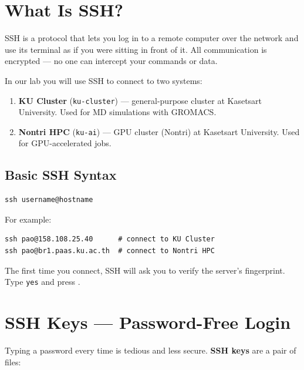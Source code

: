 \documentclass[12pt,a4paper]{article}
\newcommand{\defbox}[2]{%
  \begin{tcolorbox}[defstyle, title={#1}]
    #2
  \end{tcolorbox}
}
\newcommand{\key}[1]{\fbox{\small\ttfamily #1}}
\begin{document}
\section{What Is SSH?}

\defbox{SSH (Secure Shell)}{
  SSH is a protocol that lets you log in to a remote computer over the
  network and use its terminal as if you were sitting in front of it.
  All communication is encrypted --- no one can intercept your commands
  or data.
}

In our lab you will use SSH to connect to two systems:

\begin{enumerate}
  \item \textbf{KU Cluster} (\texttt{ku-cluster}) --- general-purpose cluster
        at Kasetsart University. Used for MD simulations with GROMACS.
  \item \textbf{Nontri HPC} (\texttt{ku-ai}) --- GPU cluster (Nontri)
        at Kasetsart University. Used for GPU-accelerated jobs.
\end{enumerate}

\subsection{Basic SSH Syntax}

\begin{lstlisting}[style=bash]
ssh username@hostname
\end{lstlisting}

For example:

\begin{lstlisting}[style=bash]
ssh pao@158.108.25.40      # connect to KU Cluster
ssh pao@br1.paas.ku.ac.th  # connect to Nontri HPC
\end{lstlisting}

The first time you connect, SSH will ask you to verify the server's
fingerprint. Type \texttt{yes} and press \key{Enter}.

\section{SSH Keys --- Password-Free Login}

Typing a password every time is tedious and less secure. \textbf{SSH keys}
are a pair of files:
\end{document}
